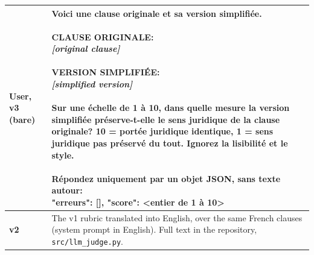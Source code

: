 \begin{tabular}{@{}p{}p{}@{}}
\midrule
\textbf{User, v3 (bare)} & \parbox[t]{0.80\textwidth}{\raggedright Voici une clause originale et sa version simplifiée.\\ \phantom{x}\\ CLAUSE ORIGINALE:\\ \emph{[original clause]}\\ \phantom{x}\\ VERSION SIMPLIFIÉE:\\ \emph{[simplified version]}\\ \phantom{x}\\ Sur une échelle de 1 à 10, dans quelle mesure la version simplifiée préserve-t-elle le sens juridique de la clause originale? 10 = portée juridique identique, 1 = sens juridique pas préservé du tout. Ignorez la lisibilité et le style.\\ \phantom{x}\\ Répondez uniquement par un objet JSON, sans texte autour:\\ {"erreurs": [], "score": <entier de 1 à 10>}} \\
\midrule
\textbf{v2} & The v1 rubric translated into English, over the same French clauses (system prompt in English). Full text in the repository, \texttt{src/llm\_judge.py}. \\
\bottomrule
\end{tabular}
